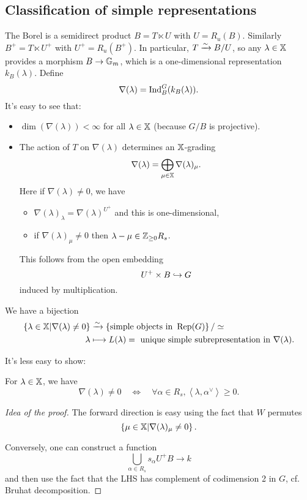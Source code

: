 \subsection{Classification of simple representations}
The Borel is a semidirect product $B=T\ltimes U$ with $U=R_u(B)$. Similarly $B^{+}=T\ltimes U^{+}$ with $U^{+}=R_u(B^{+})$. In particular, $T\xrightarrow{\sim} B /U$, so any $\lambda\in \mathbb{X}$ provides a morphism $B\to \Gm$, which is a one-dimensional representation $k_B(\lambda)$. Define
\[
\nabla(\lambda) = \operatorname{Ind}_B^{G}(k_B(\lambda)).
\] 
It's easy to see that:
\begin{itemize}
	\item $\dim(\nabla(\lambda))<\infty$ for all $\lambda\in \mathbb{X}$ (because $G /B$ is projective).
	\item The action of $T$ on $\nabla(\lambda)$ determines an $\mathbb{X}$-grading
		\[
		\nabla(\lambda) = \bigoplus_{\mu\in \mathbb{X}}\nabla(\lambda)_\mu.
		\] 
		Here if $\nabla(\lambda)\neq 0$, we have
		\begin{itemize}
			\item $\nabla(\lambda)_\lambda = \nabla(\lambda)^{U^{+}}$ and this is one-dimensional,
			\item if $\nabla(\lambda)_\mu \neq 0$ then $\lambda-\mu\in \mathbb Z_{\ge 0}R_s$.
		\end{itemize}
		This follows from the open embedding
		\[
		U^{+}\times B\hookrightarrow G
		\] 
		induced by multiplication.
\end{itemize}
\begin{corollary}
	We have a bijection 
	\begin{align*}
		\left\{ \lambda\in \XX \middle| \nabla(\lambda)\neq 0 \right\} &\simto \left\{ \text{simple objects in }\Rep(G) \right\} /\isoto \\
		\lambda &\mapsto L(\lambda) = \text{ unique simple subrepresentation in }\nabla(\lambda).
	\end{align*}
\end{corollary}
It's less easy to show:
\begin{proposition}
	For $\lambda\in \mathbb{X}$, we have
	\[
	\nabla(\lambda) \neq 0 \quad \iff\quad \forall \alpha\in R_s, \left<\lambda,\alpha ^{\vee} \right> \ge 0.
	\] 
\end{proposition}
\begin{proof}[Idea of the proof]
	The forward direction is easy using the fact that $W$ permutes
	\[
	\left\{ \mu\in \mathbb{X} \middle| \nabla(\lambda)_\mu \neq 0 \right\} .
	\] 

	Conversely, one can construct a function
	\[
	\bigcup_{\alpha\in R_s} s_\alpha U^{+}B\to k
	\] 
	and then use the fact that the LHS has complement of codimension 2 in $G$, cf. Bruhat decomposition.
\end{proof}
